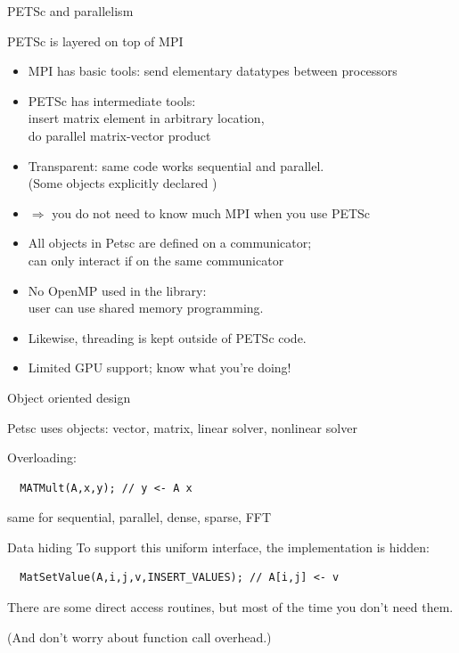 \begin{numberedframe}{PETSc and parallelism}

PETSc is layered on top of MPI

\begin{itemize}
\item
MPI has basic tools: send elementary datatypes between processors
\item PETSc has intermediate tools:\\
insert matrix element in arbitrary location,\\
do parallel matrix-vector product
\item 
  Transparent: same code works sequential and parallel.\\
  (Some objects explicitly declared )
\item 
$\Rightarrow$ you do not need to know much MPI when you use PETSc
\item
All objects in Petsc are defined on a communicator;\\
can only interact if on the same communicator
\item
No OpenMP used in the library:\\
user can use shared memory programming.
\item
Likewise, threading is kept outside of PETSc code.
\item Limited \ac{GPU} support; know what you're doing!
\end{itemize}
\end{numberedframe}

\begin{numberedframe}{Object oriented design}

Petsc uses objects: vector, matrix, linear solver, nonlinear solver

Overloading: 
\begin{verbatim}
  MATMult(A,x,y); // y <- A x
\end{verbatim}
same for sequential, parallel, dense, sparse, FFT
\end{numberedframe}

\begin{numberedframe}{Data hiding}
To support this uniform interface, the implementation is hidden:
\begin{verbatim}
  MatSetValue(A,i,j,v,INSERT_VALUES); // A[i,j] <- v
\end{verbatim}
There are some direct access routines, but most of the time you don't
need them.

(And don't worry about function call overhead.)
\end{numberedframe}
